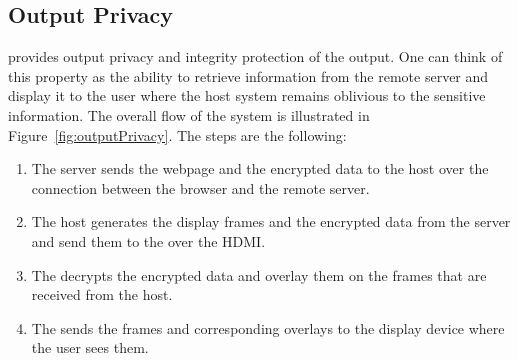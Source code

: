 \subsection{Output Privacy}
\label{sec:systemDesign:outputPrivacy}

\name provides output privacy and integrity protection of the output. One can think of this property as the ability to retrieve information from the remote server and display it to the user where the host system remains oblivious to the sensitive information. The overall flow of the system is illustrated in Figure~\ref{fig:outputPrivacy}. The steps are the following:

\begin{enumerate}
  \item[\one] The server sends the webpage and the encrypted data to the host over the \http connection between the browser and the remote server.
  \item[\two] The host generates the display frames and the encrypted data from the server and send them to the \device over the HDMI.
  \item[\three] The \device decrypts the encrypted data and overlay them on the frames that are received from the host.
  \item[\four] The \device sends the frames and corresponding overlays to the display device where the user sees them.
\end{enumerate}



